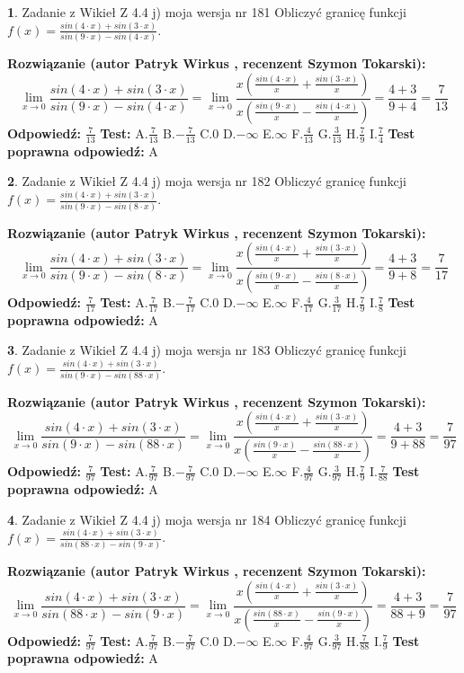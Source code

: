 \documentclass[12pt, a4paper]{article}
\theoremstyle{definition} %
\newtheorem{zad}{}
\newcommand{\zadStart}[1]{\begin{zad}#1\newline}
\newcommand{\zadStop}{\end{zad}}
\newcommand{\rozwStart}[2]{\noindent \textbf{Rozwiązanie (autor #1 , recenzent #2): }\newline}
\newcommand{\rozwStop}{\newline}
\newcommand{\odpStart}{\noindent \textbf{Odpowiedź:}\newline}
\newcommand{\odpStop}{\newline}
\newcommand{\testStart}{\noindent \textbf{Test:}\newline}
\newcommand{\testStop}{\newline}
\newcommand{\kluczStart}{\noindent \textbf{Test poprawna odpowiedź:}\newline}
\newcommand{\kluczStop}{\newline}
\begin{document}
\zadStart{Zadanie z Wikieł Z 4.4 j) moja wersja nr 181}
Obliczyć granicę funkcji $f(x)=\frac{sin(4\cdot x) +sin(3\cdot x)}{sin(9\cdot x) -sin(4\cdot x)}$.
\zadStop
\rozwStart{Patryk Wirkus}{Szymon Tokarski}
$$\lim\limits_{x\to 0}\frac{sin(4\cdot x) +sin(3\cdot x)}{sin(9\cdot x) -sin(4\cdot x)}=\lim\limits_{x\to 0}\frac{x(\frac{sin(4\cdot x)}{x}+\frac{sin(3\cdot x)}{x})}{x(\frac{sin(9\cdot x)}{x}-\frac{sin(4\cdot x)}{x})}=\frac{4+3}{9+4} = \frac{7}{13}$$
\rozwStop
\odpStart
$\frac{7}{13}$
\odpStop
\testStart
A.$\frac{7}{13}$
B.$-\frac{7}{13}$
C.$0$
D.$-\infty$
E.$\infty$
F.$\frac{4}{13}$
G.$\frac{3}{13}$
H.$\frac{7}{9}$
I.$\frac{7}{4}$
\testStop
\kluczStart
A
\kluczStop



\zadStart{Zadanie z Wikieł Z 4.4 j) moja wersja nr 182}
Obliczyć granicę funkcji $f(x)=\frac{sin(4\cdot x) +sin(3\cdot x)}{sin(9\cdot x) -sin(8\cdot x)}$.
\zadStop
\rozwStart{Patryk Wirkus}{Szymon Tokarski}
$$\lim\limits_{x\to 0}\frac{sin(4\cdot x) +sin(3\cdot x)}{sin(9\cdot x) -sin(8\cdot x)}=\lim\limits_{x\to 0}\frac{x(\frac{sin(4\cdot x)}{x}+\frac{sin(3\cdot x)}{x})}{x(\frac{sin(9\cdot x)}{x}-\frac{sin(8\cdot x)}{x})}=\frac{4+3}{9+8} = \frac{7}{17}$$
\rozwStop
\odpStart
$\frac{7}{17}$
\odpStop
\testStart
A.$\frac{7}{17}$
B.$-\frac{7}{17}$
C.$0$
D.$-\infty$
E.$\infty$
F.$\frac{4}{17}$
G.$\frac{3}{17}$
H.$\frac{7}{9}$
I.$\frac{7}{8}$
\testStop
\kluczStart
A
\kluczStop



\zadStart{Zadanie z Wikieł Z 4.4 j) moja wersja nr 183}
Obliczyć granicę funkcji $f(x)=\frac{sin(4\cdot x) +sin(3\cdot x)}{sin(9\cdot x) -sin(88\cdot x)}$.
\zadStop
\rozwStart{Patryk Wirkus}{Szymon Tokarski}
$$\lim\limits_{x\to 0}\frac{sin(4\cdot x) +sin(3\cdot x)}{sin(9\cdot x) -sin(88\cdot x)}=\lim\limits_{x\to 0}\frac{x(\frac{sin(4\cdot x)}{x}+\frac{sin(3\cdot x)}{x})}{x(\frac{sin(9\cdot x)}{x}-\frac{sin(88\cdot x)}{x})}=\frac{4+3}{9+88} = \frac{7}{97}$$
\rozwStop
\odpStart
$\frac{7}{97}$
\odpStop
\testStart
A.$\frac{7}{97}$
B.$-\frac{7}{97}$
C.$0$
D.$-\infty$
E.$\infty$
F.$\frac{4}{97}$
G.$\frac{3}{97}$
H.$\frac{7}{9}$
I.$\frac{7}{88}$
\testStop
\kluczStart
A
\kluczStop



\zadStart{Zadanie z Wikieł Z 4.4 j) moja wersja nr 184}
Obliczyć granicę funkcji $f(x)=\frac{sin(4\cdot x) +sin(3\cdot x)}{sin(88\cdot x) -sin(9\cdot x)}$.
\zadStop
\rozwStart{Patryk Wirkus}{Szymon Tokarski}
$$\lim\limits_{x\to 0}\frac{sin(4\cdot x) +sin(3\cdot x)}{sin(88\cdot x) -sin(9\cdot x)}=\lim\limits_{x\to 0}\frac{x(\frac{sin(4\cdot x)}{x}+\frac{sin(3\cdot x)}{x})}{x(\frac{sin(88\cdot x)}{x}-\frac{sin(9\cdot x)}{x})}=\frac{4+3}{88+9} = \frac{7}{97}$$
\rozwStop
\odpStart
$\frac{7}{97}$
\odpStop
\testStart
A.$\frac{7}{97}$
B.$-\frac{7}{97}$
C.$0$
D.$-\infty$
E.$\infty$
F.$\frac{4}{97}$
G.$\frac{3}{97}$
H.$\frac{7}{88}$
I.$\frac{7}{9}$
\testStop
\kluczStart
A
\kluczStop
\end{document}
